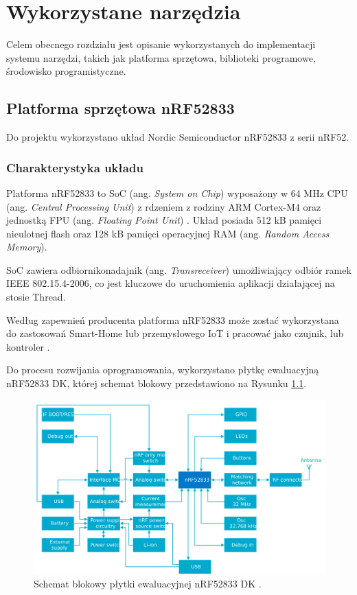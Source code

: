 \chapter{Wykorzystane narzędzia}
\label{cha:narzedzia}

Celem obecnego rozdziału jest opisanie wykorzystanych do implementacji systemu narzędzi, takich jak platforma sprzętowa, biblioteki programowe, środowisko programistyczne.

\section{Platforma sprzętowa nRF52833}

Do projektu wykorzystano układ Nordic Semiconductor nRF52833 z serii nRF52.

\subsection{Charakterystyka układu}

    Platforma nRF52833 to SoC (ang. \textit{System on Chip}) wyposażony w 64 MHz CPU (ang. \textit{Central Processing Unit}) z rdzeniem z rodziny ARM Cortex-M4 oraz jednostką FPU (ang. \textit{Floating Point Unit}) \cite{nrf52833-characteristics}.
    Układ posiada 512 kB pamięci nieulotnej flash oraz 128 kB pamięci operacyjnej RAM (ang. \textit{Random Access Memory}).

    SoC zawiera odbiornikonadajnik (ang. \textit{Transreceiver}) umożliwiający odbiór ramek IEEE 802.15.4-2006, co jest kluczowe do uruchomienia aplikacji działającej na stosie Thread.

    Według zapewnień producenta platforma nRF52833 może zostać wykorzystana do zastosowań Smart-Home lub przemysłowego IoT i pracować jako czujnik, lub kontroler \cite{nrf52833-characteristics}.

    Do procesu rozwijania oprogramowania, wykorzystano płytkę ewaluacyjną nRF52833 DK, której schemat blokowy przedstawiono na Rysunku \ref{fig:nrf8233-block-diagram}.

    \begin{figure}[H]
        \centering
        \includegraphics[width=0.8\linewidth]{graphics/external/nrf52833DK_block_diagram.jpg}
        \caption{Schemat blokowy płytki ewaluacyjnej nRF52833 DK \cite{nrf52833-diagram}.}
        \label{fig:nrf8233-block-diagram}
    \end{figure}

